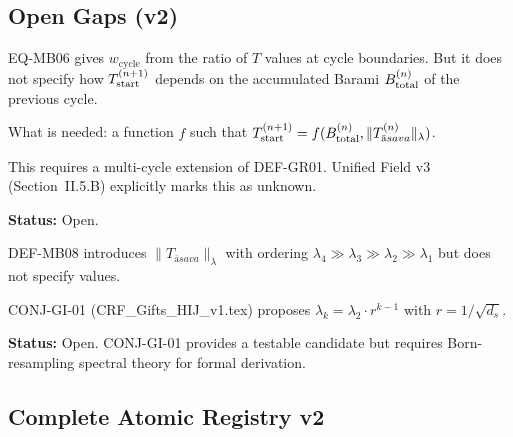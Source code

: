 \documentclass[12pt, a4paper]{article}
\providecommand{\ltwo}{\lambda_2}
\providecommand{\Tasava}{T_{\bar{\mathrm{a}}sava}}
\providecommand{\wcyc}{w_{\mathrm{cycle}}}
\providecommand{\Tasava}{\mathcal{T}_{\!\mathrm{\bar{a}sava}}}
\begin{document}
\subsection{Open Gaps (v2)}


\begin{openqbox}[title={GAP-MB01: Inter-Cycle
  $T$-Transfer Function (Open)}]
EQ-MB06 gives $\wcyc$ from the ratio of $T$ values
at cycle boundaries. But it does not specify how
$T^{(n+1)}_{\rm start}$ depends on the accumulated
Barami $B^{(n)}_{\rm total}$ of the previous cycle.

What is needed: a function $f$ such that
$T^{(n+1)}_{\rm start} = f(B^{(n)}_{\rm total},
\|\Tasava^{(n)}\|_\lambda)$.

This requires a multi-cycle extension of DEF-GR01.
Unified Field v3 (Section~II.5.B) explicitly marks
this as unknown.

\textbf{Status:} Open.
\end{openqbox}

\begin{openqbox}[title={GAP-MB02: Layer Weights
  $\lambda_k$ (Open; CONJ-GI-01 Candidate)}]
DEF-MB08 introduces $\|\Tasava\|_\lambda$ with ordering
$\lambda_4 \gg \lambda_3 \gg \lambda_2 \gg \lambda_1$
but does not specify values.

CONJ-GI-01 (CRF\_Gifts\_HIJ\_v1.tex) proposes
$\lambda_k = \ltwo \cdot r^{k-1}$ with
$r = 1/\sqrt{d_s}$.

\textbf{Status:} Open. CONJ-GI-01 provides a testable
candidate but requires Born-resampling spectral theory
for formal derivation.
\end{openqbox}

\subsection{Complete Atomic Registry v2}

\end{document}

